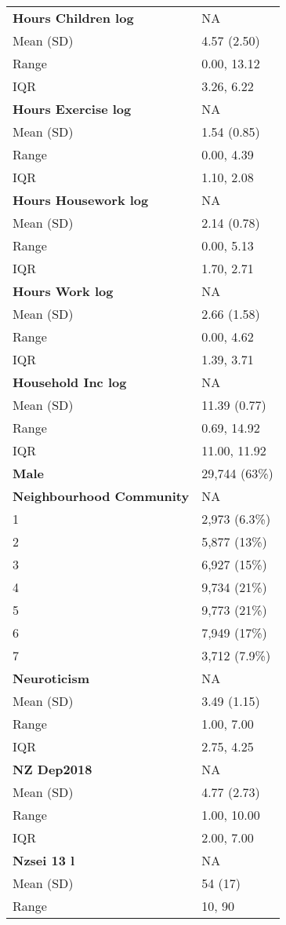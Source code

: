 \documentclass[
  singlecolumn]{article}
\begin{document}
\begin{longtable}[]{@{}ll@{}}
\textbf{Hours Children log} & NA \\
Mean (SD) & 4.57 (2.50) \\
Range & 0.00, 13.12 \\
IQR & 3.26, 6.22 \\
\textbf{Hours Exercise log} & NA \\
Mean (SD) & 1.54 (0.85) \\
Range & 0.00, 4.39 \\
IQR & 1.10, 2.08 \\
\textbf{Hours Housework log} & NA \\
Mean (SD) & 2.14 (0.78) \\
Range & 0.00, 5.13 \\
IQR & 1.70, 2.71 \\
\textbf{Hours Work log} & NA \\
Mean (SD) & 2.66 (1.58) \\
Range & 0.00, 4.62 \\
IQR & 1.39, 3.71 \\
\textbf{Household Inc log} & NA \\
Mean (SD) & 11.39 (0.77) \\
Range & 0.69, 14.92 \\
IQR & 11.00, 11.92 \\
\textbf{Male} & 29,744 (63\%) \\
\textbf{Neighbourhood Community} & NA \\
1 & 2,973 (6.3\%) \\
2 & 5,877 (13\%) \\
3 & 6,927 (15\%) \\
4 & 9,734 (21\%) \\
5 & 9,773 (21\%) \\
6 & 7,949 (17\%) \\
7 & 3,712 (7.9\%) \\
\textbf{Neuroticism} & NA \\
Mean (SD) & 3.49 (1.15) \\
Range & 1.00, 7.00 \\
IQR & 2.75, 4.25 \\
\textbf{NZ Dep2018} & NA \\
Mean (SD) & 4.77 (2.73) \\
Range & 1.00, 10.00 \\
IQR & 2.00, 7.00 \\
\textbf{Nzsei 13 l} & NA \\
Mean (SD) & 54 (17) \\
Range & 10, 90 \\

\end{longtable}
\end{document}

